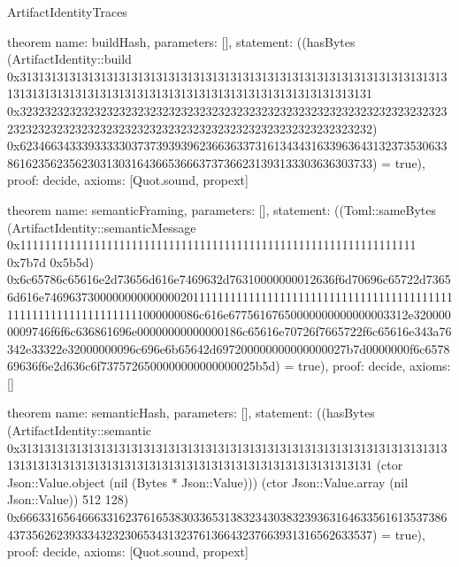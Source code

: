 \begin{lexlean}{ArtifactIdentityTraces}
\begin{semanticmodule}
theorem{
 name: buildHash,
 parameters: [],
 statement: ((hasBytes (ArtifactIdentity::build 0x31313131313131313131313131313131313131313131313131313131313131313131313131313131313131313131313131313131313131313131313131313131 0x32323232323232323232323232323232323232323232323232323232323232323232323232323232323232323232323232323232323232323232323232323232) 0x62346634333933333037373939396236636337316134343163396364313237353063386162356235623031303164366536663737366231393133303636303733) = true),
 proof: decide{},
 axioms: [Quot.sound, propext]
}

theorem{
 name: semanticFraming,
 parameters: [],
 statement: ((Toml::sameBytes (ArtifactIdentity::semanticMessage 0x1111111111111111111111111111111111111111111111111111111111111111 0x7b7d 0x5b5d) 0x6c65786c65616e2d73656d616e7469632d76310000000012636f6d70696c65722d73656d616e7469637300000000000000201111111111111111111111111111111111111111111111111111111111111111000000086c616e67756167650000000000000003312e3200000009746f6f6c636861696e00000000000000186c65616e70726f7665722f6c65616e343a76342e33322e32000000096c696e6b65642d697200000000000000027b7d0000000f6c657869636f6e2d636c6f7375726500000000000000025b5d) = true),
 proof: decide{},
 axioms: []
}

theorem{
 name: semanticHash,
 parameters: [],
 statement: ((hasBytes (ArtifactIdentity::semantic 0x31313131313131313131313131313131313131313131313131313131313131313131313131313131313131313131313131313131313131313131313131313131 (ctor Json::Value.object (nil (Bytes * Json::Value))) (ctor Json::Value.array (nil Json::Value)) 512 128) 0x66633165646663316237616538303365313832343038323936316463356161353738643735626239333432323065343132376136643237663931316562633537) = true),
 proof: decide{},
 axioms: [Quot.sound, propext]
}
\end{semanticmodule}
\end{lexlean}
